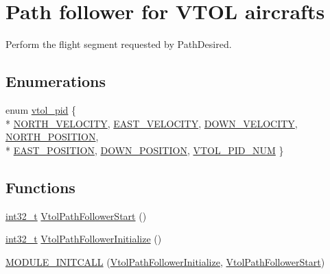\hypertarget{group___vtol_path_follower}{\section{Path follower for V\-T\-O\-L aircrafts}
\label{group___vtol_path_follower}
}


Perform the flight segment requested by Path\-Desired.  


\subsection*{Enumerations}
\begin{DoxyCompactItemize}
\item 
enum \hyperlink{group___vtol_path_follower_gaa1cc793c473ad52ad906c7feecdb3a37}{vtol\-\_\-pid} \{ \\*
\hyperlink{group___vtol_path_follower_ggaa1cc793c473ad52ad906c7feecdb3a37ae45cff8467cdb386a31197540e5bdd56}{N\-O\-R\-T\-H\-\_\-\-V\-E\-L\-O\-C\-I\-T\-Y}, 
\hyperlink{group___vtol_path_follower_ggaa1cc793c473ad52ad906c7feecdb3a37aedb9ece820ccb3967caa3a880963724e}{E\-A\-S\-T\-\_\-\-V\-E\-L\-O\-C\-I\-T\-Y}, 
\hyperlink{group___vtol_path_follower_ggaa1cc793c473ad52ad906c7feecdb3a37ac40aaeb4635693d0cf03af8e9372708d}{D\-O\-W\-N\-\_\-\-V\-E\-L\-O\-C\-I\-T\-Y}, 
\hyperlink{group___vtol_path_follower_ggaa1cc793c473ad52ad906c7feecdb3a37a3f46558976ca7c653cc8c08475bcab2a}{N\-O\-R\-T\-H\-\_\-\-P\-O\-S\-I\-T\-I\-O\-N}, 
\\*
\hyperlink{group___vtol_path_follower_ggaa1cc793c473ad52ad906c7feecdb3a37a16d8665516d2ff93c39520ff3a7aaa10}{E\-A\-S\-T\-\_\-\-P\-O\-S\-I\-T\-I\-O\-N}, 
\hyperlink{group___vtol_path_follower_ggaa1cc793c473ad52ad906c7feecdb3a37a545c2f2e31b041e3c0dec80772eacc04}{D\-O\-W\-N\-\_\-\-P\-O\-S\-I\-T\-I\-O\-N}, 
\hyperlink{group___vtol_path_follower_ggaa1cc793c473ad52ad906c7feecdb3a37ac92fcbf75f1c93775999e6788aa2342d}{V\-T\-O\-L\-\_\-\-P\-I\-D\-\_\-\-N\-U\-M}
 \}
\end{DoxyCompactItemize}
\subsection*{Functions}
\begin{DoxyCompactItemize}
\item 
\hyperlink{group___n_a_m_e_gafd12020da5a235dfcf0c3c748fb5baed}{int32\-\_\-t} \hyperlink{group___vtol_path_follower_ga961a79aed22b448a7401bcca54fbeed4}{Vtol\-Path\-Follower\-Start} ()
\item 
\hyperlink{group___n_a_m_e_gafd12020da5a235dfcf0c3c748fb5baed}{int32\-\_\-t} \hyperlink{group___vtol_path_follower_gaec33cc9b4cda3af1231529c8ef0dc9d1}{Vtol\-Path\-Follower\-Initialize} ()
\item 
\hyperlink{group___vtol_path_follower_ga304541063acff929281e0000e4a966da}{M\-O\-D\-U\-L\-E\-\_\-\-I\-N\-I\-T\-C\-A\-L\-L} (\hyperlink{group___vtol_path_follower_gaec33cc9b4cda3af1231529c8ef0dc9d1}{Vtol\-Path\-Follower\-Initialize}, \hyperlink{group___vtol_path_follower_ga961a79aed22b448a7401bcca54fbeed4}{Vtol\-Path\-Follower\-Start})
\end{DoxyCompactItemize}


